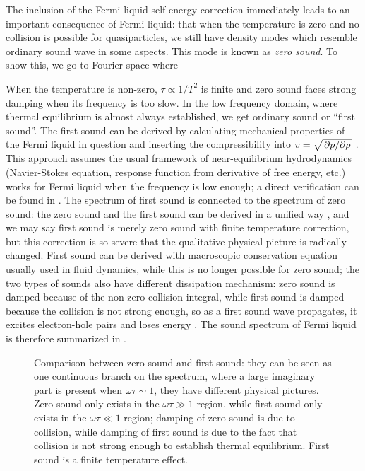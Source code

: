 \documentclass[hyperref, a4paper]{article}
\begin{document}
The inclusion of the Fermi liquid self-energy correction 
immediately leads to an important consequence 
of Fermi liquid: 
that when the temperature is zero and 
no collision is possible for quasiparticles, 
we still have density modes which resemble 
ordinary sound wave in some aspects. 
This mode is known as \emph{zero sound}.
To show this, we go to Fourier space where 

When the temperature is non-zero,
$\tau \propto 1 / T^2$ is finite 
and zero sound faces strong damping 
when its frequency is too slow.
In the low frequency domain, 
where thermal equilibrium is almost always established,
we get ordinary sound or ``first sound''.
The first sound can be derived 
by calculating mechanical properties of the Fermi liquid in question 
and inserting the compressibility 
into $v = \sqrt{\pdv*{p}{\rho}}$ \cite{lifshitz2013statistical}.
This approach assumes the usual framework of near-equilibrium hydrodynamics 
(Navier-Stokes equation, response function from derivative of free energy, etc.)
works for Fermi liquid when the frequency is low enough; 
a direct verification can be found in \cite{belitz2022soft}.
The spectrum of first sound 
is connected to the spectrum of zero sound:
the zero sound and the first sound can be derived 
in a unified way \cite{khalatnikov1958dispersion},
and we may say first sound is 
merely zero sound with finite temperature correction, 
but this correction is so severe that the qualitative physical picture 
is radically changed.
First sound can be derived with macroscopic conservation equation 
usually used in fluid dynamics,
while this is no longer possible for zero sound;
the two types of sounds also have different dissipation mechanism:
zero sound is damped because of the non-zero collision integral,
while first sound is damped because the collision is not strong enough,
so as a first sound wave propagates,
it excites electron-hole pairs 
and loses energy
\cite{abel1966propagation,belitz2022soft}. 
The sound spectrum of Fermi liquid is therefore summarized in .

\begin{figure}
    \centering
    
    \caption{Comparison between zero sound and first sound: 
    they can be seen as one continuous branch 
    on the spectrum, 
    where a large imaginary part is present when $\omega \tau \sim 1$,
    they have different physical pictures.
    Zero sound only exists in the $\omega \tau \gg 1$ region,
    while first sound only exists in the $\omega \tau \ll 1$ region;
    damping of zero sound is due to collision,
    while damping of first sound is due to the fact that
    collision is not strong enough to establish thermal equilibrium.
    First sound is a finite temperature effect.}
    \label{fig:sound-comparison}
\end{figure}
\end{document}
